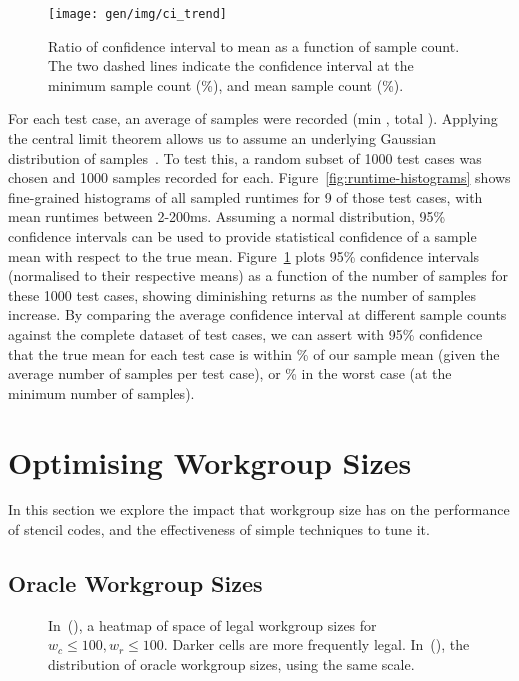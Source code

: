 \begin{figure}
\centering
\texttt{[image: gen/img/ci\_trend]}
\caption{%
  Ratio of confidence interval to mean as a function of sample
  count. The two dashed lines indicate the confidence interval at the
  minimum sample count (\%), and mean sample count
  (\%).%
}
\label{fig:ci-trends}
\end{figure}


For each test case, an average of  samples
were recorded (min , total
). Applying the central limit theorem allows us
to assume an underlying Gaussian distribution of
samples~\cite{Georges2007}. To test this, a random subset of 1000 test
cases was chosen and 1000 samples recorded for
each. Figure~\ref{fig:runtime-histograms} shows fine-grained
histograms of all sampled runtimes for 9 of those test cases, with
mean runtimes between 2-200ms. Assuming a normal distribution, 95\%
confidence intervals can be used to provide statistical confidence of
a sample mean with respect to the true
mean. Figure~\ref{fig:ci-trends} plots 95\% confidence intervals
(normalised to their respective means) as a function of the number of
samples for these 1000 test cases, showing diminishing returns as the
number of samples increase. By comparing the average confidence
interval at different sample counts against the complete dataset of
 test cases, we can assert with 95\%
confidence that the true mean for each test case is within
\% of our sample mean (given the average number of
samples per test case), or \% in the worst case (at
the minimum number of samples). 


\section{Optimising Workgroup Sizes}

In this section we explore the impact that workgroup size has on the
performance of stencil codes, and the effectiveness of simple
techniques to tune it.

\subsection{Oracle Workgroup Sizes}


\begin{figure}

\caption{%
  In~(), a heatmap of space of legal workgroup
  sizes for $w_c \le 100, w_r \le 100$. Darker cells are more
  frequently legal. In~(), the distribution
  of oracle workgroup sizes, using the same scale.   %
}
\label{fig:heatmaps}
\end{figure}

